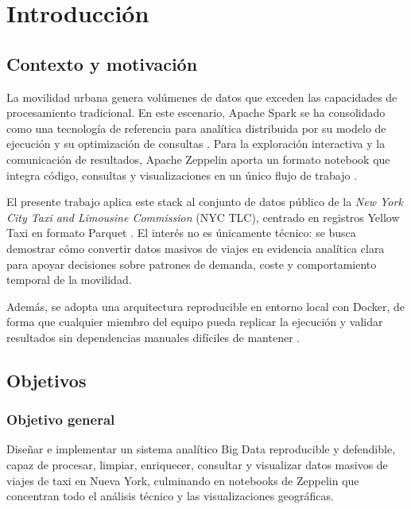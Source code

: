 \chapter{Introducción}\label{cap:introduccion}

\section{Contexto y motivación}
La movilidad urbana genera volúmenes de datos que exceden las capacidades de
procesamiento tradicional. En este escenario, Apache Spark se ha consolidado como una
tecnología de referencia para analítica distribuida por su modelo de ejecución y su
optimización de consultas \cite{zaharia2012resilient,armbrust2015sparksql,sparkdocs}.
Para la exploración interactiva y la comunicación de resultados, Apache Zeppelin aporta
un formato notebook que integra código, consultas y visualizaciones en un único flujo
de trabajo \cite{zeppelindocs}.

El presente trabajo aplica este stack al conjunto de datos público de la
\textit{New York City Taxi and Limousine Commission} (NYC TLC), centrado en registros
Yellow Taxi en formato Parquet \cite{nyctlc,nyctlcparquet,parquetdocs}. El interés no
es únicamente técnico: se busca demostrar cómo convertir datos masivos de viajes en
evidencia analítica clara para apoyar decisiones sobre patrones de demanda, coste y
comportamiento temporal de la movilidad.

Además, se adopta una arquitectura reproducible en entorno local con Docker, de forma
que cualquier miembro del equipo pueda replicar la ejecución y validar resultados sin
dependencias manuales difíciles de mantener \cite{dockerdocs}.

\section{Objetivos}
\subsection{Objetivo general}
Diseñar e implementar un sistema analítico Big Data reproducible y defendible,
capaz de procesar, limpiar, enriquecer, consultar y visualizar datos masivos de
viajes de taxi en Nueva York, culminando en notebooks de Zeppelin que
concentran todo el análisis técnico y las visualizaciones geográficas.

